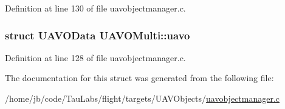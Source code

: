 \-Definition at line 130 of file uavobjectmanager.\-c.

\hypertarget{struct_u_a_v_o_multi_a718e24f6eadeb8508309dcb0eeeb9bda}{
\subsubsection[{uavo}]{\setlength{\rightskip}{0pt plus 5cm}struct {\bf \-U\-A\-V\-O\-Data} {\bf \-U\-A\-V\-O\-Multi\-::uavo}}}\label{struct_u_a_v_o_multi_a718e24f6eadeb8508309dcb0eeeb9bda}


\-Definition at line 128 of file uavobjectmanager.\-c.



\-The documentation for this struct was generated from the following file\-:\begin{DoxyCompactItemize}
\item 
/home/jb/code/\-Tau\-Labs/flight/targets/\-U\-A\-V\-Objects/\hyperlink{uavobjectmanager_8c}{uavobjectmanager.\-c}\end{DoxyCompactItemize}
